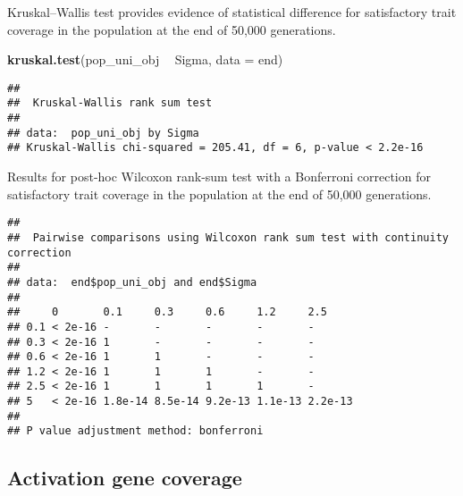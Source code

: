 \documentclass[]{book}
\newenvironment{Shaded}{\begin{snugshade}}{\end{snugshade}}
\newcommand{\DataTypeTok}[1]{\textcolor[rgb]{0.13,0.29,0.53}{#1}}
\newcommand{\KeywordTok}[1]{\textcolor[rgb]{0.13,0.29,0.53}{\textbf{#1}}}
\newcommand{\NormalTok}[1]{#1}
\newcommand{\OperatorTok}[1]{\textcolor[rgb]{0.81,0.36,0.00}{\textbf{#1}}}
\newcommand{\OtherTok}[1]{\textcolor[rgb]{0.56,0.35,0.01}{#1}}
\newcommand{\StringTok}[1]{\textcolor[rgb]{0.31,0.60,0.02}{#1}}
\begin{document}
Kruskal--Wallis test provides evidence of statistical difference for satisfactory trait coverage in the population at the end of 50,000 generations.

\begin{Shaded}
\begin{Highlighting}[]
\KeywordTok{kruskal.test}\NormalTok{(pop_uni_obj }\OperatorTok{~}\StringTok{ }\NormalTok{Sigma, }\DataTypeTok{data =}\NormalTok{ end)}
\end{Highlighting}
\end{Shaded}

\begin{verbatim}
## 
##  Kruskal-Wallis rank sum test
## 
## data:  pop_uni_obj by Sigma
## Kruskal-Wallis chi-squared = 205.41, df = 6, p-value < 2.2e-16
\end{verbatim}

Results for post-hoc Wilcoxon rank-sum test with a Bonferroni correction for satisfactory trait coverage in the population at the end of 50,000 generations.

\begin{Shaded}
\end{Shaded}

\begin{verbatim}
## 
##  Pairwise comparisons using Wilcoxon rank sum test with continuity correction 
## 
## data:  end$pop_uni_obj and end$Sigma 
## 
##     0       0.1     0.3     0.6     1.2     2.5    
## 0.1 < 2e-16 -       -       -       -       -      
## 0.3 < 2e-16 1       -       -       -       -      
## 0.6 < 2e-16 1       1       -       -       -      
## 1.2 < 2e-16 1       1       1       -       -      
## 2.5 < 2e-16 1       1       1       1       -      
## 5   < 2e-16 1.8e-14 8.5e-14 9.2e-13 1.1e-13 2.2e-13
## 
## P value adjustment method: bonferroni
\end{verbatim}

\hypertarget{activation-gene-coverage-10}{%
\subsection{Activation gene coverage}\label{activation-gene-coverage-10}}
\end{document}
